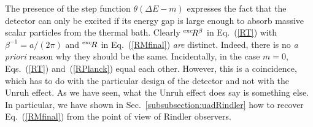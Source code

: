 \documentclass[12pt,nofootinbib,floatfix,aps,prd,showpacs,amsmath,amssymb,eqsecnum]{revtex4-2}
\begin{document}
The presence of the step function $\theta (\Delta E -m)$ expresses the fact
that the detector can only be excited if its energy gap is large enough
to absorb massive scalar particles from the thermal bath. Clearly 
$^{\rm exc}\! R^\beta$ in Eq.~(\ref{RT}) with $\beta^{-1} = a/(2 \pi)$ and 
$^{\rm exc}\! R$ in  Eq.~(\ref{RMfinal}) {\em are} distinct. Indeed, 
there is no {\em a priori} reason 
why they should be the same.  Incidentally,
in the case $m=0$, 
Eqs.~(\ref{RT})  and~(\ref{RPlanck}) equal each other. 
However,
this is a coincidence, which has to do with the particular design 
of the detector and not with the Unruh effect.  As we have seen, 
what the Unruh effect does say is something else. In particular,
we have shown in Sec.~\ref{subsubsection:uadRindler}
how to recover Eq.~(\ref{RMfinal}) from the point of view of Rindler 
observers. 
\end{document}
